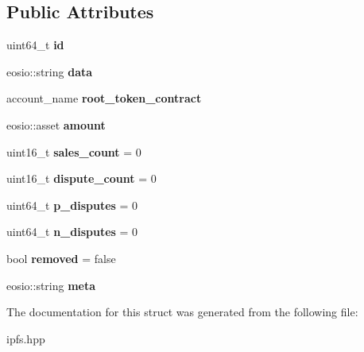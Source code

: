\subsection*{Public Attributes}
\begin{DoxyCompactItemize}
\item 
\mbox{\label{structeosio_1_1orbdata_a7d3fcbaa4a955649e6b6bec9ecc04826}} 
uint64\+\_\+t {\bfseries id}
\item 
\mbox{\label{structeosio_1_1orbdata_a46df88e04923c977f060e8d8efaebdac}} 
eosio\+::string {\bfseries data}
\item 
\mbox{\label{structeosio_1_1orbdata_a2aa1a91798e7c192afd600b147900d46}} 
account\+\_\+name {\bfseries root\+\_\+token\+\_\+contract}
\item 
\mbox{\label{structeosio_1_1orbdata_aac5b31656fa0e7473b81b2ff62efba23}} 
eosio\+::asset {\bfseries amount}
\item 
\mbox{\label{structeosio_1_1orbdata_acbd3d1896716bb0bbf342d66f5e02433}} 
uint16\+\_\+t {\bfseries sales\+\_\+count} = 0
\item 
\mbox{\label{structeosio_1_1orbdata_ae3ee1d9a54dc2d69340c1d5bdec2e445}} 
uint16\+\_\+t {\bfseries dispute\+\_\+count} = 0
\item 
\mbox{\label{structeosio_1_1orbdata_a2a0739b00dd009b8dc8dd4ddbc7c97c2}} 
uint64\+\_\+t {\bfseries p\+\_\+disputes} = 0
\item 
\mbox{\label{structeosio_1_1orbdata_a55bdf3ae153967b8658a05bc0905002b}} 
uint64\+\_\+t {\bfseries n\+\_\+disputes} = 0
\item 
\mbox{\label{structeosio_1_1orbdata_ae771787ed84473bcefc8a4e3684fe568}} 
bool {\bfseries removed} = false
\item 
\mbox{\label{structeosio_1_1orbdata_a91b304a9f709c1ca939916bb85ca073d}} 
eosio\+::string {\bfseries meta}
\end{DoxyCompactItemize}


The documentation for this struct was generated from the following file\+:\begin{DoxyCompactItemize}
\item 
ipfs.\+hpp\end{DoxyCompactItemize}
